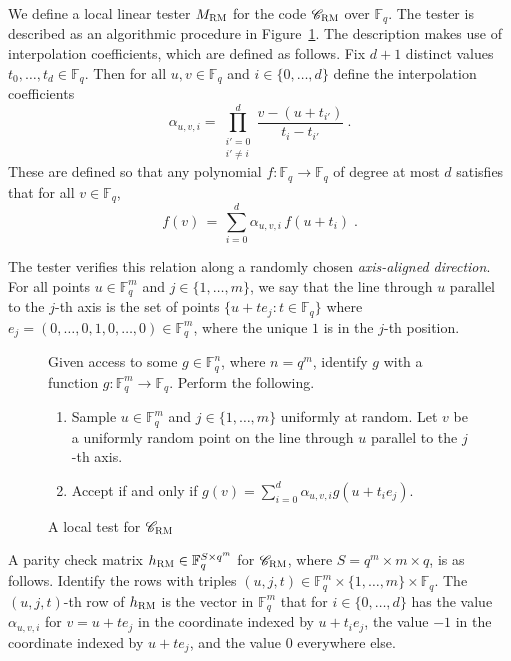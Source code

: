 \documentclass[11pt]{article}
\theoremstyle{definition}
\newcommand{\code}{\mathscr{C}}
\newcommand{\F}{\ensuremath{\mathbb{F}}}
\newcommand{\RM}{\ensuremath{\textsc{RM}}}
\newenvironment{gamespec}{
  \begin{mdframed}[style=figstyle]}{
  \end{mdframed}}
\begin{document}
We define a local linear tester $M_{\RM}$ for the code $\code_\RM$ over $\F_q$. The tester is described as an algorithmic procedure in Figure~\ref{fig:RM-tester}. %
The description makes use of interpolation coefficients, which are defined as follows. Fix $d+1$ distinct values $t_0,\ldots,t_d \in \F_q$. Then for all $u,v \in \F_q$ and $i \in \{0,\ldots,d\}$ define the interpolation coefficients
 \begin{equation}\label{eq:interp-coeff}
 \alpha_{u,v,i} = \prod_{\substack{i'=0\\i'\neq i}}^{d}  \frac{v - (u + t_{i'})}{t_i - t_{i'}}~.
 \end{equation}
These are defined so that any polynomial $f:\F_q\to\F_q$ of degree at most $d$ satisfies
that for all $v \in \F_q$, 
\[ f(v)\,=\, \sum_{i=0}^{d} \alpha_{u,v,i} \, f(u+t_i)\;.\]

The tester verifies this relation along a randomly chosen \emph{axis-aligned direction}.  For all points $u \in \F_q^m$ and $j \in \{1,\ldots,m\}$, we say that the line through $u$ parallel to the $j$-th axis is the set of points $\{ u + te_j : t \in \F_q \}$ where $e_j=(0,\ldots,0,1,0,\ldots,0)\in \F_q^m$, where the unique $1$ is in the $j$-th position. 


\begin{figure}[!htbp]
  \centering
  \begin{gamespec}
Given access to some $g\in \F_q^n$, where $n=q^m$, identify $g$ with a function $g:\F_q^m\to \F_q$. Perform the following.
\begin{enumerate}
	\item Sample	$u\in \F_q^m$ and $j\in \{1,\ldots,m\}$ uniformly at random. Let $v$ be a uniformly random point on the line through $u$ parallel to the $j$-th axis.
	\item 
	Accept if and only if $g(v) = \sum_{i=0}^{d} \alpha_{u,v,i} g(u+t_i e_j)$. 
    \end{enumerate}
  \end{gamespec}
  \caption{A local test for $\code_{\RM}$}
  \label{fig:RM-tester}
\end{figure}

A parity check matrix $h_{\RM} \in \F_q^{S \times q^m}$ for $\code_{\RM}$, where $S = q^m \times m \times q$, is as follows. Identify the rows with triples $(u,j,t) \in \F_q^m \times \{1,\ldots,m\} \times \F_q$. The $(u,j,t)$-th row of $h_{\RM}$ is the vector in $\F_q^m$ that for $i \in \{0,\ldots,d\}$ has the value $\alpha_{u,v,i}$ for $v = u + t e_j$ in the coordinate indexed by $u + t_i e_j$, the value $-1$ in the coordinate indexed by $u + te_j$, and the value $0$ everywhere else. 
\end{document}
